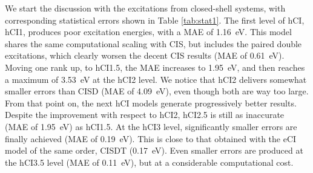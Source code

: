 \documentclass[aip,jcp,reprint,noshowkeys,superscriptaddress]{revtex4-1}
\begin{document}
We start the discussion with the excitations from closed-shell systems, with corresponding statistical errors shown in Table \ref{tab:stat1}.
The first level of hCI, hCI1, produces poor excitation energies, with a MAE of \SI{1.16}{\eV}.
This model shares the same computational scaling with CIS, but includes the paired double excitations,
which clearly worsen the decent CIS results (MAE of \SI{0.61}{\eV}).
Moving one rank up, to hCI1.5, the MAE increases to \SI{1.95}{\eV}, and then reaches a maximum of \SI{3.53}{\eV} at the hCI2 level.
We notice that hCI2 delivers somewhat smaller errors than CISD (MAE of \SI{4.09}{\eV}), even though both are way too large.
From that point on, the next hCI models generate progressively better results.
Despite the improvement with respect to hCI2, hCI2.5 is still as inaccurate (MAE of \SI{1.95}{\eV}) as hCI1.5.
At the hCI3 level, significantly smaller errors are finally achieved (MAE of \SI{0.19}{\eV}).
This is close to that obtained with the eCI model of the same order, CISDT (\SI{0.17}{\eV}).
Even smaller errors are produced at the hCI3.5 level (MAE of \SI{0.11}{\eV}), but at a considerable computational cost.
\end{document}
